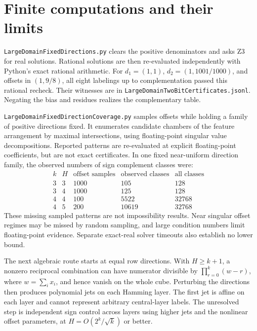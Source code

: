 \documentclass[11pt]{article}
\begin{document}
\section{Finite computations and their limits}

\texttt{LargeDomainFixedDirections.py} clears the positive denominators
and asks Z3 for real solutions. Rational solutions are then re-evaluated
independently with Python's exact rational arithmetic. For
$d_1=(1,1)$, $d_2=(1,1001/1000)$, and offsets in $(1,9/8)$, all eight
labelings up to complementation passed this rational recheck. Their
witnesses are in \texttt{LargeDomainTwoBitCertificates.jsonl}. Negating
the bias and residues realizes the complementary table.

\texttt{LargeDomainFixedDirectionCoverage.py} samples offsets while
holding a family of positive directions fixed. It enumerates candidate
chambers of the feature arrangement by maximal intersections, using
floating-point singular value decompositions. Reported patterns are
re-evaluated at explicit floating-point coefficients, but are not exact
certificates. In one fixed near-uniform direction family, the observed
numbers of sign complement classes were:
\[
\begin{array}{c|c|r|r|r}
 k&H&\text{offset samples}&\text{observed classes}&\text{all classes}\\
 3&3&1000&105&128\\
 3&4&1000&125&128\\
 4&4&100&5522&32768\\
 4&5&200&10619&32768
\end{array}
\]
These missing sampled patterns are not impossibility results. Near
singular offset regimes may be missed by random sampling, and large
condition numbers limit floating-point evidence. Separate exact-real
solver timeouts also establish no lower bound.

The next algebraic route starts at equal row directions. With $H\geq
k+1$, a nonzero reciprocal combination can have numerator divisible by
$\prod_{r=0}^k(w-r)$, where $w=\sum_i x_i$, and hence vanish on the whole
cube. Perturbing the directions then produces polynomial jets on each
Hamming layer. The first jet is affine on each layer and cannot represent
arbitrary central-layer labels. The unresolved step is independent
sign control across layers using higher jets and the nonlinear offset
parameters, at $H=O(2^k/\sqrt{k})$ or better.
\end{document}
